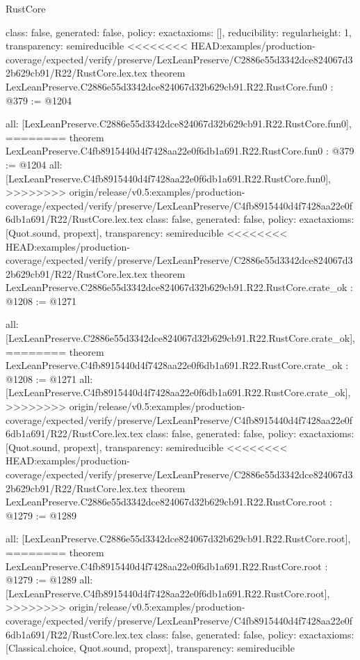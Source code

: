 \begin{lexlean}{RustCore}
\begin{coremodule}
{\begin{coremodule}
{{{  class: false,
  generated: false,
  policy: exact{axioms: []},
  reducibility: regular{height: 1},
  transparency: semireducible
}
<<<<<<<< HEAD:examples/production-coverage/expected/verify/preserve/LexLeanPreserve/C2886e55d3342dce824067d32b629cb91/R22/RustCore.lex.tex
theorem LexLeanPreserve.C2886e55d3342dce824067d32b629cb91.R22.RustCore.fun0 : @379 := @1204 {
  all: [LexLeanPreserve.C2886e55d3342dce824067d32b629cb91.R22.RustCore.fun0],
========
theorem LexLeanPreserve.C4fb8915440d4f7428aa22e0f6db1a691.R22.RustCore.fun0 : @379 := @1204 {
  all: [LexLeanPreserve.C4fb8915440d4f7428aa22e0f6db1a691.R22.RustCore.fun0],
>>>>>>>> origin/release/v0.5:examples/production-coverage/expected/verify/preserve/LexLeanPreserve/C4fb8915440d4f7428aa22e0f6db1a691/R22/RustCore.lex.tex
  class: false,
  generated: false,
  policy: exact{axioms: [Quot.sound, propext]},
  transparency: semireducible
}
<<<<<<<< HEAD:examples/production-coverage/expected/verify/preserve/LexLeanPreserve/C2886e55d3342dce824067d32b629cb91/R22/RustCore.lex.tex
theorem LexLeanPreserve.C2886e55d3342dce824067d32b629cb91.R22.RustCore.crate_ok : @1208 := @1271 {
  all: [LexLeanPreserve.C2886e55d3342dce824067d32b629cb91.R22.RustCore.crate_ok],
========
theorem LexLeanPreserve.C4fb8915440d4f7428aa22e0f6db1a691.R22.RustCore.crate_ok : @1208 := @1271 {
  all: [LexLeanPreserve.C4fb8915440d4f7428aa22e0f6db1a691.R22.RustCore.crate_ok],
>>>>>>>> origin/release/v0.5:examples/production-coverage/expected/verify/preserve/LexLeanPreserve/C4fb8915440d4f7428aa22e0f6db1a691/R22/RustCore.lex.tex
  class: false,
  generated: false,
  policy: exact{axioms: [Quot.sound, propext]},
  transparency: semireducible
}
<<<<<<<< HEAD:examples/production-coverage/expected/verify/preserve/LexLeanPreserve/C2886e55d3342dce824067d32b629cb91/R22/RustCore.lex.tex
theorem LexLeanPreserve.C2886e55d3342dce824067d32b629cb91.R22.RustCore.root : @1279 := @1289 {
  all: [LexLeanPreserve.C2886e55d3342dce824067d32b629cb91.R22.RustCore.root],
========
theorem LexLeanPreserve.C4fb8915440d4f7428aa22e0f6db1a691.R22.RustCore.root : @1279 := @1289 {
  all: [LexLeanPreserve.C4fb8915440d4f7428aa22e0f6db1a691.R22.RustCore.root],
>>>>>>>> origin/release/v0.5:examples/production-coverage/expected/verify/preserve/LexLeanPreserve/C4fb8915440d4f7428aa22e0f6db1a691/R22/RustCore.lex.tex
  class: false,
  generated: false,
  policy: exact{axioms: [Classical.choice, Quot.sound, propext]},
  transparency: semireducible
}

}}}}}
\end{coremodule}}
\end{coremodule}
\end{lexlean}
